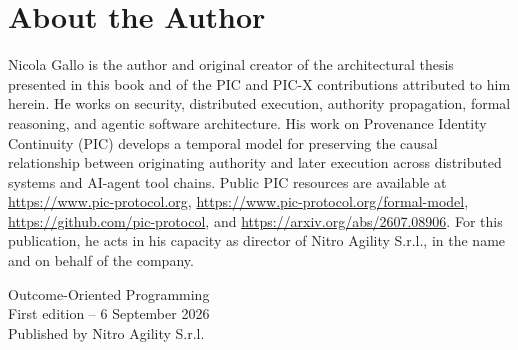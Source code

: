 \documentclass[10pt,oneside,openany]{book}
\begin{document}
\chapter*{About the Author}
Nicola Gallo is the author and original creator of the architectural thesis presented in this book and of the PIC and PIC-X contributions attributed to him herein. He works on security, distributed execution, authority propagation, formal reasoning, and agentic software architecture. His work on Provenance Identity Continuity (PIC) develops a temporal model for preserving the causal relationship between originating authority and later execution across distributed systems and AI-agent tool chains. Public PIC resources are available at \url{https://www.pic-protocol.org}, \url{https://www.pic-protocol.org/formal-model}, \url{https://github.com/pic-protocol}, and \url{https://arxiv.org/abs/2607.08906}. For this publication, he acts in his capacity as director of Nitro Agility S.r.l., in the name and on behalf of the company.

\vfill
\begin{center}
\sffamily\small
Outcome-Oriented Programming\\
First edition -- 6 September 2026\\
Published by Nitro Agility S.r.l.
\end{center}
\end{document}
